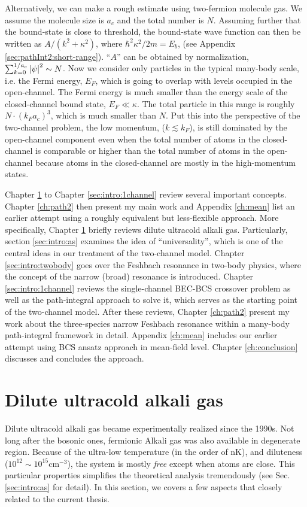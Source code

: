 Alternatively, we can make a rough estimate using two-fermion molecule gas. We assume the molecule size is $a_{c}$ and the total number is $N$.  Assuming further that the bound-state is close to threshold,   the bound-state wave function can then be written as $A/(k^{2}+\kappa^{2})$, where $\hbar^{2}\kappa^{2}/2m=E_{b}$, (see Appendix \ref{sec:pathInt2:short-range}). ``$A$'' can be obtained by normalization, $\sum_{k=0}^{1/a_{c}}\left\lvert{\psi}\right\rvert^{2}\sim{}N$. Now  we consider only particles in the typical many-body scale, i.e. the Fermi energy, $E_{F}$, which is going to overlap with levels occupied in the open-channel. The Fermi energy is much smaller than the energy scale of the closed-channel bound state, $E_{F}\ll\kappa$.  The total particle in this range is roughly $N\cdot(k_{F}a_{c})^{3}$, which is much smaller than $N$. Put this into the perspective of the two-channel problem, the low momentum,  ($k\lesssim{}k_F$), is still dominated by the open-channel component even when the total number of atoms in the closed-channel is comparable or higher than the total number  of atoms in the open-channel because atoms in the closed-channel are mostly in the high-momentum states.     

Chapter \ref{sec:intro:one} to Chapter \ref{sec:intro:1channel} review several important concepts.  Chapter \ref{ch:path2} then present my main work  and Appendix \ref{ch:mean}  list an earlier attempt using a roughly equivalent but less-flexible approach.  More specifically, Chapter \ref{sec:intro:one} briefly reviews  dilute ultracold alkali gas.   Particularly, section \ref{sec:intro:as} examines the idea of ``universality'', which is one of the central ideas in our treatment of the two-channel model.  Chapter \ref{sec:intro:twobody} goes over the Feshbach resonance in two-body physics, where the concept of  the narrow (broad) resonance is introduced. Chapter \ref{sec:intro:1channel} reviews the single-channel BEC-BCS crossover problem as well as the path-integral approach to solve it, which serves as the starting point of the two-channel model. After these reviews,   Chapter \ref{ch:path2} present my work about the three-species narrow Feshbach resonance within a many-body path-integral framework in detail.   Appendix \ref{ch:mean} includes our earlier attempt   using BCS ansatz  approach in mean-field level.  Chapter \ref{ch:conclusion} discusses and concludes the approach.  

\chapter{Dilute ultracold alkali gas}\label{sec:intro:one}
Dilute ultracold alkali gas became experimentally realized since the 1990s.  Not long after the bosonic ones, fermionic Alkali gas was also available in degenerate region.  Because of the ultra-low temperature (in the order of nK), and diluteness ($10^{12}\sim10^{15}\text{cm}^{-3}$), the system is mostly \emph{free} except when atoms are close.   This particular properties simplifies the theoretical analysis tremendously (see Sec. \ref{sec:intro:as} for detail).  In this section, we covers a few aspects that closely related to the current thesis.     

